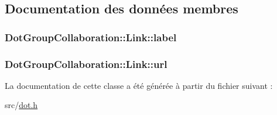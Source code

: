 \subsection{Documentation des données membres}
\hypertarget{class_dot_group_collaboration_1_1_link_aaea36ab56bf3845f2f60805a434b3262}{}
\subsubsection[{label}]{ Dot\+Group\+Collaboration\+::\+Link\+::label}\label{class_dot_group_collaboration_1_1_link_aaea36ab56bf3845f2f60805a434b3262}
\hypertarget{class_dot_group_collaboration_1_1_link_a73dde739c55a41c9fd8cd2786dcc4f28}{}
\subsubsection[{url}]{ Dot\+Group\+Collaboration\+::\+Link\+::url}\label{class_dot_group_collaboration_1_1_link_a73dde739c55a41c9fd8cd2786dcc4f28}


La documentation de cette classe a été générée à partir du fichier suivant \+:\begin{DoxyCompactItemize}
\item 
src/\hyperlink{dot_8h}{dot.\+h}\end{DoxyCompactItemize}
